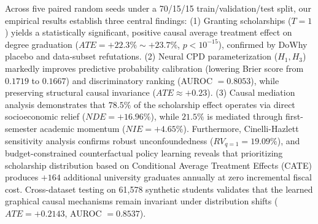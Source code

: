 Across five paired random seeds under a 70/15/15 train/validation/test split, our empirical results establish three central findings:
(1) Granting scholarships ($T=1$) yields a statistically significant, positive causal average treatment effect on degree graduation ($ATE = +22.3\% \sim +23.7\%$, $p < 10^{-15}$), confirmed by DoWhy placebo and data-subset refutations.
(2) Neural CPD parameterization ($H_1, H_3$) markedly improves predictive probability calibration (lowering Brier score from $0.1719$ to $0.1667$) and discriminatory ranking (AUROC $= 0.8053$), while preserving structural causal invariance ($ATE \approx +0.23$).
(3) Causal mediation analysis demonstrates that $78.5\%$ of the scholarship effect operates via direct socioeconomic relief ($NDE = +16.96\%$), while $21.5\%$ is mediated through first-semester academic momentum ($NIE = +4.65\%$). 
Furthermore, Cinelli-Hazlett sensitivity analysis confirms robust unconfoundedness ($RV_{q=1} = 19.09\%$), and budget-constrained counterfactual policy learning reveals that prioritizing scholarship distribution based on Conditional Average Treatment Effects (CATE) produces $+164$ additional university graduates annually at zero incremental fiscal cost. Cross-dataset testing on 61,578 synthetic students validates that the learned graphical causal mechanisms remain invariant under distribution shifts ($ATE = +0.2143$, AUROC $= 0.8537$).
